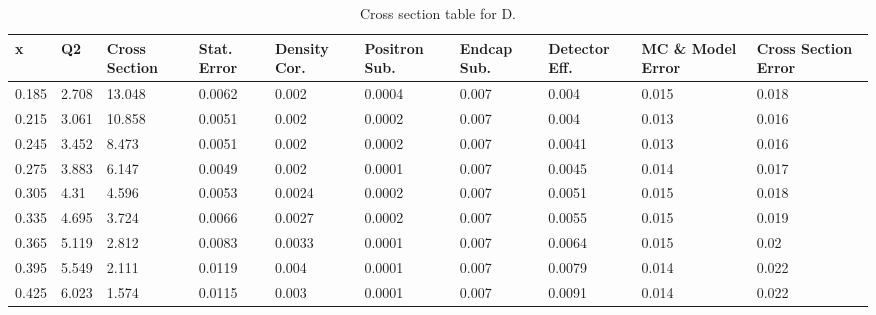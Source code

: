 \pagebreak
{}
\thispagestyle{lscape}
\begin{landscape}

	\begin{table}
			\centering
	\caption{Cross section table for D.}\label{CST_D2}
	\begin{tabular}{|p{1cm}|p{1cm}|p{1.5cm}|p{1.5cm}|p{2cm}|p{2cm}|p{1.5cm}|p{1.5cm}|p{2.5cm}|p{2.5cm}|}
	\hline
	x     & Q2     & Cross Section & Stat. Error & Density Cor. & Positron Sub. & Endcap Sub. & Detector Eff. & MC \& Model Error & Cross Section Error \\ \hline
		0.185 & 2.708  & 13.048        & 0.0062            & 0.002              & 0.0004               & 0.007              & 0.004                 & 0.015             & 0.018               \\ \hline
		0.215 & 3.061  & 10.858        & 0.0051            & 0.002              & 0.0002               & 0.007              & 0.004                 & 0.013             & 0.016               \\ \hline
		0.245 & 3.452  & 8.473         & 0.0051            & 0.002              & 0.0002               & 0.007              & 0.0041                & 0.013             & 0.016               \\ \hline
		0.275 & 3.883  & 6.147         & 0.0049            & 0.002              & 0.0001               & 0.007              & 0.0045                & 0.014             & 0.017               \\ \hline
		0.305 & 4.31   & 4.596         & 0.0053            & 0.0024             & 0.0002               & 0.007              & 0.0051                & 0.015             & 0.018               \\ \hline
		0.335 & 4.695  & 3.724         & 0.0066            & 0.0027             & 0.0002               & 0.007              & 0.0055                & 0.015             & 0.019               \\ \hline
		0.365 & 5.119  & 2.812         & 0.0083            & 0.0033             & 0.0001               & 0.007              & 0.0064                & 0.015             & 0.02                \\ \hline
		0.395 & 5.549  & 2.111         & 0.0119            & 0.004              & 0.0001               & 0.007              & 0.0079                & 0.014             & 0.022               \\ \hline
		0.425 & 6.023  & 1.574         & 0.0115            & 0.003              & 0.0001               & 0.007              & 0.0091                & 0.014             & 0.022               \\ \hline

\end{tabular}
\end{table}
\end{landscape}
